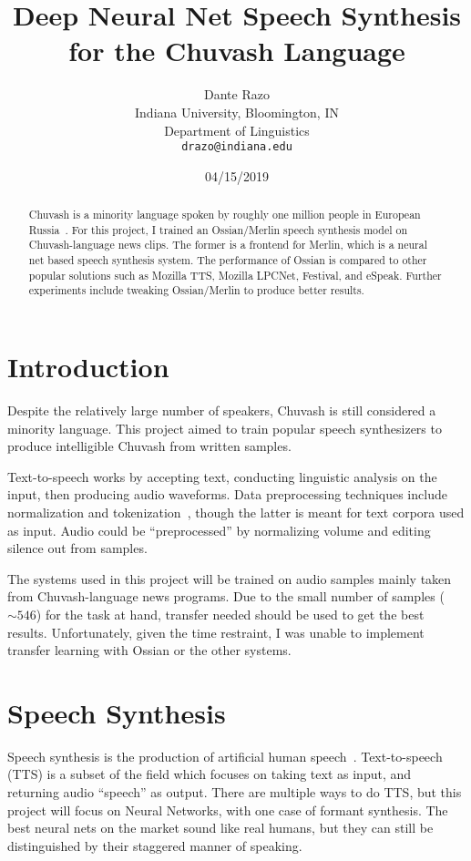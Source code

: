 \documentclass[11pt,a4paper]{article}
\title{Deep Neural Net Speech Synthesis for the Chuvash Language}
\author{Dante Razo \\
  Indiana University, Bloomington, IN \\
  Department of Linguistics \\
  {\tt drazo@indiana.edu} \\}
\date{04/15/2019}
\begin{document}
\maketitle
\begin{abstract}
  Chuvash is a minority language spoken by roughly one million people in European Russia~\cite{RBS:12}. For this project, I trained an Ossian/Merlin speech synthesis model on Chuvash-language news clips. The former is a frontend for Merlin, which is a neural net based speech synthesis system. The performance of Ossian is compared to other popular solutions such as Mozilla TTS, Mozilla LPCNet, Festival, and eSpeak. Further experiments include tweaking Ossian/Merlin to produce better results.
\end{abstract}

\section{Introduction}\label{sect:intro}
Despite the relatively large number of speakers, Chuvash is still considered a minority language. This project aimed to train popular speech synthesizers to produce intelligible Chuvash from written samples.

Text-to-speech works by accepting text, conducting linguistic analysis on the input, then producing audio waveforms. Data preprocessing techniques include normalization and tokenization~\cite{wiki-lexanalysis}, though the latter is meant for text corpora used as input. Audio could be ``preprocessed'' by normalizing volume and editing silence out from samples.

The systems used in this project will be trained on audio samples mainly taken from Chuvash-language news programs. Due to the small number of samples ($\sim546$) for the task at hand, transfer needed should be used to get the best results. Unfortunately, given the time restraint, I was unable to implement transfer learning with Ossian or the other systems.

\section{Speech Synthesis}\label{sect:speech}
Speech synthesis is the production of artificial human speech~\cite{wiki-speechsynthesis}. Text-to-speech (TTS) is a subset of the field which focuses on taking text as input, and returning audio ``speech'' as output. There are multiple ways to do TTS, but this project will focus on Neural Networks, with one case of formant synthesis. The best neural nets on the market sound like real humans, but they can still be distinguished by their staggered manner of speaking.
\end{document}
